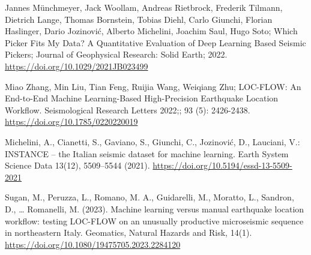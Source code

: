 \documentclass{llncs}
\begin{document}
\begin{thebibliography}{9}
Jannes Münchmeyer, Jack Woollam, Andreas Rietbrock, Frederik Tilmann, 
Dietrich Lange, Thomas Bornstein, Tobias Diehl, Carlo Giunchi, 
Florian Haslinger, Dario Jozinović, Alberto Michelini, Joachim Saul, Hugo Soto; 
Which Picker Fits My Data? A Quantitative Evaluation of Deep Learning Based 
Seismic Pickers; Journal of Geophysical Research: Solid Earth; 2022. 
\url{https://doi.org/10.1029/2021JB023499}

Miao Zhang, Min Liu, Tian Feng, Ruijia Wang, Weiqiang Zhu; LOC-FLOW: An 
End-to-End Machine Learning-Based High-Precision Earthquake Location Workflow. 
Seismological Research Letters 2022;; 93 (5): 2426-2438.
\url{https://doi.org/10.1785/0220220019}

Michelini, A., Cianetti, S., Gaviano, S., Giunchi, C., Jozinović, D., Lauciani, V.:
INSTANCE -- the Italian seismic dataset for machine learning.
Earth System Science Data 13(12), 5509--5544 (2021).
\url{https://doi.org/10.5194/essd-13-5509-2021}

Sugan, M., Peruzza, L., Romano, M. A., Guidarelli, M., Moratto, L., Sandron, 
D., … Romanelli, M. (2023). Machine learning versus manual earthquake location 
workflow: testing LOC-FLOW on an unusually productive microseismic sequence in 
northeastern Italy. Geomatics, Natural Hazards and Risk, 14(1). 
\url{https://doi.org/10.1080/19475705.2023.2284120}

\end{thebibliography}
\end{document}

